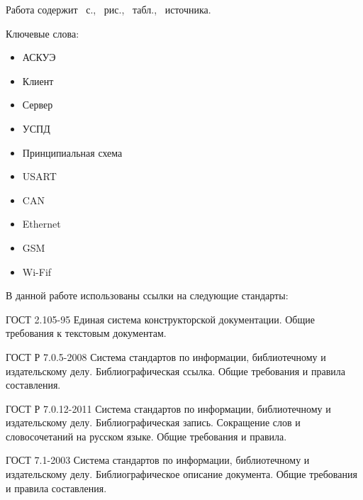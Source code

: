 \documentclass[utf8,14pt, coursreport]{G7-32}
\begin{document}

\frontmatter %



\Referat %

Работа содержит \totalpages{}~с., \totalfigures{}~рис., \totaltables{}~табл., \totalbibs{}~источника.

Ключевые слова:
\begin{itemize}
\item АСКУЭ
\item Клиент
\item Сервер
\item УСПД
\item Принципиальная схема
\item USART
\item CAN
\item Ethernet
\item GSM
\item Wi-Fif
\end{itemize}

\tableofcontents

\iffalse
\NormRefs

В данной работе использованы ссылки на следующие стандарты:

ГОСТ 2.105-95 Единая система конструкторской документации. Общие требования к текстовым документам.

ГОСТ Р 7.0.5-2008 Система стандартов по информации, библиотечному и издательскому делу. Библиографическая ссылка. Общие требования и правила составления.

ГОСТ Р 7.0.12-2011 Система стандартов по информации, библиотечному и издательскому делу. Библиографическая запись. Сокращение слов и словосочетаний на русском языке. Общие требования и правила.

ГОСТ 7.1-2003 Система стандартов по информации, библиотечному и издательскому делу. Библиографическое описание документа. Общие требования и правила составления.
\end{document}
